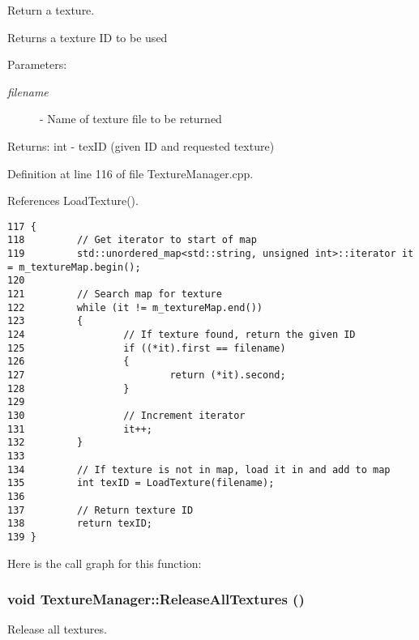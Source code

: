 Return a texture. 

Returns a texture ID to be used

\begin{Desc}
\item[Parameters:]
\begin{description}
\item[{\em filename}]- Name of texture file to be returned\end{description}
\end{Desc}
\begin{Desc}
\item[Returns:]int - texID (given ID and requested texture) \end{Desc}


Definition at line 116 of file TextureManager.cpp.

References LoadTexture().

\begin{Code}\begin{verbatim}117 {
118         // Get iterator to start of map
119         std::unordered_map<std::string, unsigned int>::iterator it = m_textureMap.begin();
120 
121         // Search map for texture
122         while (it != m_textureMap.end())
123         {
124                 // If texture found, return the given ID
125                 if ((*it).first == filename)
126                 {
127                         return (*it).second;
128                 }
129 
130                 // Increment iterator
131                 it++;
132         }
133 
134         // If texture is not in map, load it in and add to map
135         int texID = LoadTexture(filename);
136 
137         // Return texture ID
138         return texID;
139 }
\end{verbatim}
\end{Code}




Here is the call graph for this function:\hypertarget{class_texture_manager_d8dca8bd689671a1186a093ae54c57d3}{
\subsubsection[ReleaseAllTextures]{\setlength{\rightskip}{0pt plus 5cm}void TextureManager::ReleaseAllTextures ()}}
\label{class_texture_manager_d8dca8bd689671a1186a093ae54c57d3}


Release all textures. 

